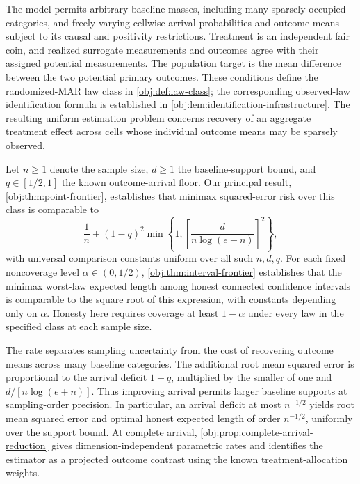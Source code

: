 \documentclass[11pt]{article}
\begin{document}
The model permits arbitrary baseline masses, including many sparsely occupied categories, and freely varying cellwise arrival probabilities and outcome means subject to its causal and positivity restrictions. Treatment is an independent fair coin, and realized surrogate measurements and outcomes agree with their assigned potential measurements. The population target is the mean difference between the two potential primary outcomes. These conditions define the randomized-MAR law class in \cref{obj:def:law-class}; the corresponding observed-law identification formula is established in \cref{obj:lem:identification-infrastructure}. The resulting uniform estimation problem concerns recovery of an aggregate treatment effect across cells whose individual outcome means may be sparsely observed.

Let \(n\ge1\) denote the sample size, \(d\ge1\) the baseline-support bound, and \(q\in[1/2,1]\) the known outcome-arrival floor. Our principal result, \cref{obj:thm:point-frontier}, establishes that minimax squared-error risk over this class is comparable to
\[
\frac1n+(1-q)^2
\min\left\{1,\left[\frac{d}{n\log(e+n)}\right]^2\right\},
\]
with universal comparison constants uniform over all such \(n,d,q\). For each fixed noncoverage level \(\alpha\in(0,1/2)\), \cref{obj:thm:interval-frontier} establishes that the minimax worst-law expected length among honest connected confidence intervals is comparable to the square root of this expression, with constants depending only on \(\alpha\). Honesty here requires coverage at least \(1-\alpha\) under every law in the specified class at each sample size.

The rate separates sampling uncertainty from the cost of recovering outcome means across many baseline categories. The additional root mean squared error is proportional to the arrival deficit \(1-q\), multiplied by the smaller of one and \(d/[n\log(e+n)]\). Thus improving arrival permits larger baseline supports at sampling-order precision. In particular, an arrival deficit at most \(n^{-1/2}\) yields root mean squared error and optimal honest expected length of order \(n^{-1/2}\), uniformly over the support bound. At complete arrival, \cref{obj:prop:complete-arrival-reduction} gives dimension-independent parametric rates and identifies the estimator as a projected outcome contrast using the known treatment-allocation weights.
\end{document}
